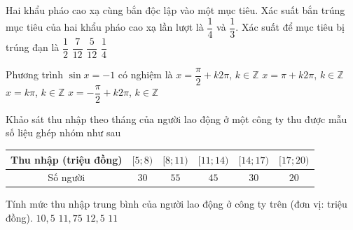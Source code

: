 \begin{ex}%
    Hai khẩu pháo cao xạ cùng bắn độc lập vào một mục tiêu. Xác suất bắn trúng mục tiêu của hai khẩu pháo cao xạ lần lượt là $\dfrac{1}{4}$ và $\dfrac{1}{3}$. Xác suất để mục tiêu bị trúng đạn là
    \choice
    {\True $\dfrac{1}{2}$}
    {$\dfrac{7}{12}$}
    {$\dfrac{5}{12}$}
    {$\dfrac{1}{4}$}
\end{ex}

\begin{ex}%
    Phương trình $\sin x=-1$ có nghiệm là
    \choice
    {$x=\dfrac{\pi}{2}+k2\pi$, $k\in\mathbb{Z}$}
    {$x=\pi+k2\pi$, $k\in\mathbb{Z}$}
    {$x=k\pi$, $k\in\mathbb{Z}$}
    {\True $x=-\dfrac{\pi}{2}+k2\pi$, $k\in\mathbb{Z}$}
\end{ex}

\begin{ex}%
    Khảo sát thu nhập theo tháng của người lao động ở một công ty thu được mẫu số liệu ghép nhóm như sau
    \begin{center}
    \begin{tabular}{|c|c|c|c|c|c|}
    \hline
    Thu nhập (triệu đồng) & $[5;8)$ & $[8;11)$ & $[11;14)$ & $[14;17)$ & $[17;20)$ \\ \hline
    Số người & $30$ & $55$ & $45$ & $30$ & $20$ \\ \hline
    \end{tabular}
    \end{center}
    Tính mức thu nhập trung bình của người lao động ở công ty trên (đơn vị: triệu đồng).
    \choice
    {$10{,}5$}
    {\True $11{,}75$}
    {$12{,}5$}
    {$11$}
\end{ex}

